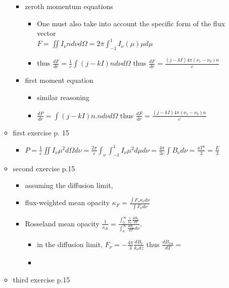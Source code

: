 \documentclass[10pt,a4paper]{article}
\begin{document}
\begin{enumerate}
\begin{itemize}
\begin{itemize}
\item zeroth momentum equations
\begin{itemize}
\item One must also take into account the specific form of the flux vector \\ $F = \iint I_{\nu} n d\nu d\Omega = 2 \pi \int_{-1}^1 I_{\nu}(\mu) \mu d \mu$
\item thus $\frac{dF}{dr} = \frac{1}{c} \int (j-kI) n d\nu d\Omega$ thus $\boxed{\frac{dF}{dr} = \frac{(j-kI)4\pi(\nu_1-\nu_0)n}{c}}$
\end{itemize} 

\item first moment equation
\begin{itemize}
\item similar reasoning
\item $\frac{dP}{dr} = \int (j-kI) n.n d\nu d\Omega$ thus $\boxed{\frac{dF}{dr} = \frac{(j-kI)4\pi(\nu_1-\nu_0)n}{c}}$
\end{itemize}
\end{itemize}

\item first exercise p. 15
\begin{itemize}
\item $P = \frac{1}{c}\iint I_{\nu} \mu^2 d\Omega d\nu = \frac{2 \pi}{c} \int_{\nu} \int_{-1}^{1} I_{\nu} \mu^2 d\mu d\nu = \frac{4 \pi}{3c} \int B_{\nu} d\nu = \frac{a T^4}{3} = \frac{E}{3} $
\end{itemize}

\item second exercise p.15 
\begin{itemize}
\item assuming the diffusion limit, 
\item flux-weighted mean opacity $\kappa_F = \frac{\int F_{\nu} \kappa_{\nu}d\nu}{\int F_{\nu} d\nu}$
\item Rosseland mean opacity $\frac{1}{\kappa_R} = \frac{\int_0^{\infty}\frac{1}{\kappa_{\nu}}\frac{dB_{\nu}}{dT}}{\int_0^{\infty} \frac{dB_{\nu}}{dT} d\nu}$. 
\begin{itemize}
\item in the diffusion limit, $F_{\nu} = - \frac{4 \pi}{3}\frac{d B_{\nu}}{k_{\nu} dz}$ thus $\frac{dB_{nu}}{dT} =$
\item  
\end{itemize}
\end{itemize}


\item third exercise p.15


\end{itemize}
\end{enumerate}
\end{document}
